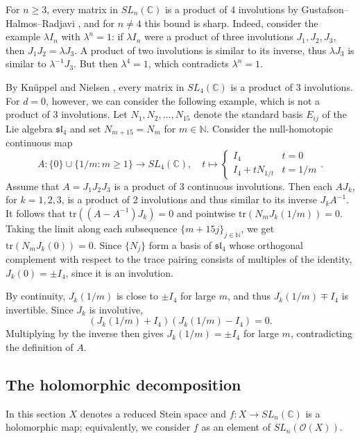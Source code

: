 \documentclass{amsart}
\newcommand{\C}{\mathbb{C}}
\newcommand{\N}{\mathbb N}
\newcommand{\holo}{\mathcal{O}}
\theoremstyle{definition}
\begin{document}
For $n\geq3$, every matrix in $SL_n(\C)$ is a product of 4 involutions by Gustafson--Halmos--Radjavi \cite{MR0399284}, and for $n \neq 4$ this bound is sharp. Indeed, consider the example $\lambda I_n$ with $\lambda^n = 1$: if $\lambda I_n$ were a product of three involutions $J_1, J_2, J_3$, then $J_1 J_2 =  \lambda J_3$. A product of two involutions is similar to its inverse, thus $\lambda J_3$ is similar to $\lambda^{-1}J_3$. But then $\lambda^4 = 1$, which contradicts $\lambda^n=1$. 

By Kn{\" u}ppel and Nielsen \cite{MR1112667}, every matrix in $SL_4(\C)$ is a product of 3 involutions. For $d=0$, however, we can consider the following example, which is not a product of 3 involutions. Let $N_1, N_2, \dots, N_{15}$ denote the standard basis $E_{ij}$ of the Lie algebra $\mathfrak{sl}_4$ and set $N_{m+15}=N_m$ for $m \in \N$. Consider the null-homotopic continuous map 
\[
 A : \{0\}\cup\{1/m:m\geq1\} \to SL_4(\C), \quad t \mapsto \begin{cases}
     I_4 & t = 0 \\
     I_4 + t N_{1/t} &  t = 1/m
 \end{cases}.
\]
Assume that $A = J_1 J_2 J_3$ is a product of 3 continuous involutions. Then each $AJ_k$, for $k=1,2,3$, is a product of 2 involutions and thus similar to its inverse $J_k A^{-1}$. It follows that $\mathrm{tr} ((A-A^{-1})J_k)=0$ and pointwise $\mathrm{tr}(N_m J_k(1/m))=0$. Taking the limit along each subsequence $\{ m + 15 j\}_{j \in \N }$, we get $\mathrm{tr}(N_m J_k(0)) = 0$. Since $\{N_j\}$ form a basis of $\mathfrak{sl}_4$ whose orthogonal complement with respect to the trace pairing consists of multiples of the identity, $J_k(0) = \pm I_4$, since it is an involution. 

By continuity, $J_k(1/m)$ is close to $\pm I_4$ for large $m$, and thus $J_k(1/m) \mp I_4$ is invertible. Since $J_k$ is involutive, 
\[
    (J_k(1/m) + I_4 ) ( J_k(1/m) - I_4 ) = 0.
\]
Multiplying by the inverse then gives $J_k(1/m) = \pm I_4$ for large $m$, contradicting the definition of $A$. 



\subsection{The holomorphic decomposition} \label{sufficient-holo}
In this section $X$ denotes a reduced Stein space and $f : X \to SL_n(\C)$ is a holomorphic map; equivalently, we consider $f$ as an element of $SL_n (\holo(X))$. 
\end{document}
